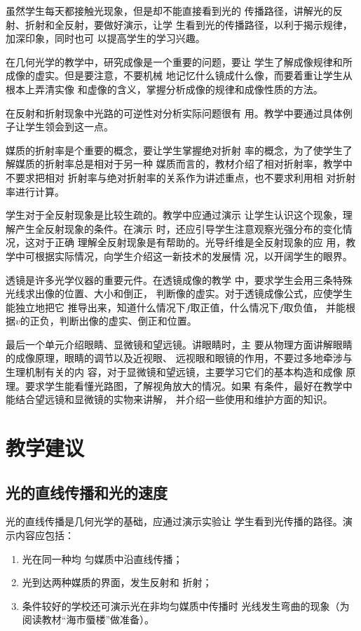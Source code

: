虽然学生每天都接触光现象，但是却不能直接看到光的
传播路径，讲解光的反射、折射和全反射，要做好演示，让学
生看到光的传播路径，以利于揭示规律，加深印象，同时也可
以提高学生的学习兴趣。

在几何光学的教学中，研究成像是一个重要的问题，要让
学生了解成像规律和所成像的虚实。但是要注意，不要机械
地记忆什么镜成什么像，而要着重让学生从根本上弄清实像
和虚像的含义，掌握分析成像的规律和成像性质的方法。

在反射和折射现象中光路的可逆性对分析实际问题很有
用。教学中要通过具体例子让学生领会到这一点。

媒质的折射率是个重要的概念，要让学生掌握绝对折射
率的概念，为了使学生了解媒质的折射率总是相对于另一种
媒质而言的，教材介绍了相对折射率，教学中不要求把相对
折射率与绝对折射率的关系作为讲述重点，也不要求利用相
对折射率进行计算。

学生对于全反射现象是比较生疏的。教学中应通过演示
让学生认识这个现象，理解产生全反射现象的条件。在演示
时，还应引导学生注意观察光强分布的变化情况，这对于正确
理解全反射现象是有帮助的。光导纤维是全反射现象的应
用，教学中可根据实际情况，向学生介绍这一新技术的发展情
况，以开阔学生的眼界。

透镜是许多光学仪器的重要元件。在透镜成像的教学
中，要求学生会用三条特殊光线求出像的位置、大小和倒正，
判断像的虚实。对于透镜成像公式，应使学生能独立地把它
推导出来，知道什么情况下$f$取正值，什么情况下$f$取负值，
并能根据$v$的正负，判断出像的虚实、倒正和位置。

最后一个单元介绍眼睛、显微镜和望远镜。讲眼睛时，主
要从物理方面讲解眼睛的成像原理，眼睛的调节以及近视眼、
远视眼和眼镜的作用，不要过多地牵涉与生理机制有关的内
容，对于显微镜和望远镜，主要学习它们的基本构造和成像
原理。要求学生能看懂光路图，了解视角放大的情况。如果
有条件，最好在教学中能结合望远镜和显微镜的实物来讲解，
并介绍一些使用和维护方面的知识。

\section{教学建议}
\subsection{光的直线传播和光的速度}
光的直线传播是几何光学的基础，应通过演示实验让
学生看到光传播的路径。演示内容应包括：
\begin{enumerate}
\item 光在同一种均
匀媒质中沿直线传播；    \item 光到达两种媒质的界面，发生反射和
折射；    \item 条件较好的学校还可演示光在非均匀媒质中传播时
光线发生弯曲的现象（为阅读教材“海市蜃楼”做准备）。
\end{enumerate}


